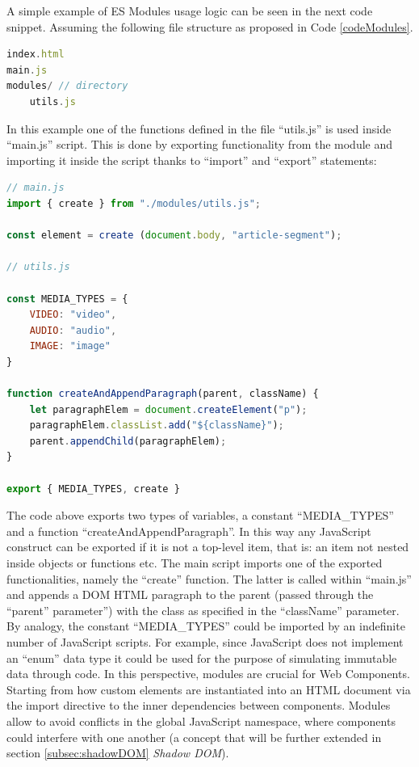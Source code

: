 A simple example of ES Modules usage logic can be seen in the next code snippet. Assuming the following file structure as proposed in Code \ref{codeModules}.
\\
\begin{lstlisting}[caption={File structure with a module},label={codeModules}, language=JavaScript]
index.html
main.js
modules/ // directory
    utils.js
\end{lstlisting}

In this example one of the functions defined in the file “utils.js” is used inside “main.js” script. This is done by exporting functionality from the module and importing it inside the script thanks to “import” and “export” statements:
\\
\begin{lstlisting}[caption={Import, export directives},label={codeImportExport}, language=JavaScript]
// main.js
import { create } from "./modules/utils.js";

const element = create (document.body, "article-segment");

// utils.js

const MEDIA_TYPES = {
    VIDEO: "video",
    AUDIO: "audio",
    IMAGE: "image"
}

function createAndAppendParagraph(parent, className) {
    let paragraphElem = document.createElement("p");
    paragraphElem.classList.add("${className}");
    parent.appendChild(paragraphElem);
}

export { MEDIA_TYPES, create }
\end{lstlisting}

The code above exports two types of variables, a constant “MEDIA\_TYPES” and a function “createAndAppendParagraph”. In this way any JavaScript construct can be exported if it is not a top-level item, that is: an item not nested inside objects or functions etc. The main script imports one of the exported functionalities, namely the “create” function. The latter is called within “main.js” and appends a DOM HTML paragraph to the parent (passed through the “parent” parameter”) with the class as specified in the “className” parameter. By analogy, the constant “MEDIA\_TYPES” could be imported by an indefinite number of JavaScript scripts. For example, since JavaScript does not implement an “enum” data type it could be used for the purpose of simulating immutable data through code.
In this perspective, modules are crucial for Web Components. Starting from how custom elements are instantiated into an HTML document via the import directive to the inner dependencies between components. Modules allow to avoid conflicts in the global JavaScript namespace, where components could interfere with one another (a concept that will be further extended in section \ref{subsec:shadowDOM} \emph{Shadow DOM}).

